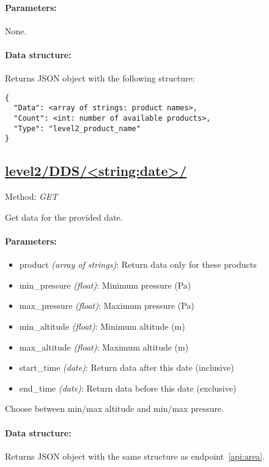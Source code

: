 \paragraph{Parameters:} None.

\paragraph{Data structure:}
Returns JSON object with the following structure:

\begin{lstlisting}[basicstyle=\footnotesize]
{
  "Data": <array of strings: product names>,
  "Count": <int: number of available products>,
  "Type": "level2_product_name"
}
\end{lstlisting}


\subsection{\url{level2/DDS/<string:date>/}}
Method: \emph{GET}

Get data for the provided date.

\paragraph{Parameters:}
\begin{itemize}
    \item product \emph{(array of strings)}: Return data only for these
        products
    \item min\_pressure \emph{(float)}: Minimum pressure (Pa)
    \item max\_pressure \emph{(float)}: Maximum pressure (Pa)
    \item min\_altitude \emph{(float)}: Minimum altitude (m)
    \item max\_altitude \emph{(float)}: Maximum altitude (m)
    \item start\_time \emph{(date)}: Return data after this date (inclusive)
    \item end\_time \emph{(date)}: Return data before this date (exclusive)
\end{itemize}

Choose between min/max altitude and min/max pressure.

\paragraph{Data structure:}
Returns JSON object with the same structure as endpoint~\ref{api:area}.


